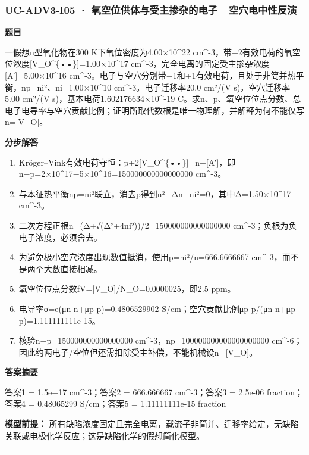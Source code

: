 \documentclass[UTF8,11pt,a4paper]{ctexart}
\begin{document}
\subsubsection*{UC-ADV3-I05 · 氧空位供体与受主掺杂的电子—空穴电中性反演}
\noindent\textbf{题目}\par
一假想n型氧化物在300 K下氧位密度为4.00×10\textasciicircum{}22 cm\textasciicircum{}-3，带+2有效电荷的氧空位浓度[V\_O\textasciicircum{}\{••\}]=1.00×10\textasciicircum{}17 cm\textasciicircum{}-3，完全电离的固定受主掺杂浓度[A′]=5.00×10\textasciicircum{}16 cm\textasciicircum{}-3。电子与空穴分别带−1和+1有效电荷，且处于非简并热平衡，np=ni²、ni=1.00×10\textasciicircum{}10 cm\textasciicircum{}-3。电子迁移率20.0 cm²/(V s)，空穴迁移率5.00 cm²/(V s)，基本电荷1.602176634×10\textasciicircum{}-19 C。求n、p、氧空位位点分数、总电子电导率与空穴贡献比例；证明所取代数根是唯一物理解，并解释为何不能仅写n=[V\_O]。\par
\medskip\noindent\textbf{分步解答}
\begin{enumerate}
\item Kröger–Vink有效电荷守恒：p+2[V\_O\textasciicircum{}\{••\}]=n+[A′]，即n−p=2×10\textasciicircum{}17−5×10\textasciicircum{}16=150000000000000000 cm\textasciicircum{}-3。
\item 与本征热平衡np=ni²联立，消去p得到n²−Δn−ni²=0，其中Δ=1.50×10\textasciicircum{}17 cm\textasciicircum{}-3。
\item 二次方程正根n=(Δ+√(Δ²+4ni²))/2=150000000000000000 cm\textasciicircum{}-3；负根为负电子浓度，必须舍去。
\item 为避免极小空穴浓度出现数值抵消，使用p=ni²/n=666.6666667 cm\textasciicircum{}-3，而不是两个大数直接相减。
\item 氧空位位点分数fV=[V\_O]/N\_O=0.0000025，即2.5 ppm。
\item 电导率σ=e(μn n+μp p)=0.4806529902 S/cm；空穴贡献比例μp p/(μn n+μp p)=1.111111111e-15。
\item 核验n−p=150000000000000000 cm\textasciicircum{}-3，np=100000000000000000000 cm\textasciicircum{}-6；因此约两电子/空位但还需扣除受主补偿，不能机械设n=[V\_O]。
\end{enumerate}
\noindent\textbf{答案摘要}\par
答案1 = 1.5e+17 cm\textasciicircum{}-3；答案2 = 666.666667 cm\textasciicircum{}-3；答案3 = 2.5e-06 fraction；答案4 = 0.48065299 S/cm；答案5 = 1.11111111e-15 fraction\par
\noindent\textbf{模型前提：}
所有缺陷浓度固定且完全电离，载流子非简并、迁移率给定，无缺陷关联或电极化学反应；这是缺陷化学的假想简化模型。\par
\medskip\hrule\medskip
{}
\end{document}
